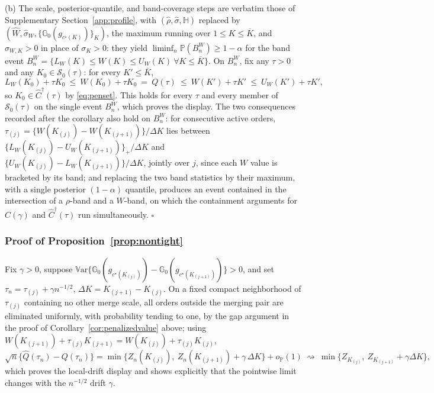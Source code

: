 \documentclass[11pt]{article}
\newcommand{\Pp}{\mathbb P}
\newcommand{\G}{\mathbb G}
\newcommand{\Var}{\mathbb V\mathrm{ar}}
\newcommand{\opro}{o_{\Pp}}
\newcommand{\dto}{\rightsquigarrow}
\newcommand{\calS}{\mathcal S}
\begin{document}
(b) The scale, posterior-quantile, and band-coverage steps are verbatim those of Supplementary Section~\ref{app:profile}, with $(\hat\rho,\hat\sigma,\mathbb H)$ replaced by $(\widehat W,\hat\sigma_W,\{\G_0(g_{c^\star(K)})\}_K)$, the maximum running over $1\le K\le\overline K$, and $\sigma_{W,K}>0$ in place of $\sigma_K>0$: they yield $\liminf_n\Pp(B^W_n)\ge1-\alpha$ for the band event $B^W_n=\{L_W(K)\le W(K)\le U_W(K)\ \forall K\le\overline K\}$. On $B^W_n$, fix any $\tau>0$ and any $K_0\in\calS_0(\tau)$: for every $K'\le\overline K$,
\begin{equation*}
L_W(K_0)+\tau K_0\ \le\ W(K_0)+\tau K_0\ =\ Q(\tau)\ \le\ W(K')+\tau K'\ \le\ U_W(K')+\tau K' ,
\end{equation*}
so $K_0\in\widehat C^\dagger(\tau)$ by \eqref{eq:penset}. This holds for every $\tau$ and every member of $\calS_0(\tau)$ on the single event $B^W_n$, which proves the display. The two consequences recorded after the corollary also hold on $B^W_n$: for consecutive active orders, $\tau_{(j)}=\{W(K_{(j)})-W(K_{(j+1)})\}/\Delta K$ lies between $\{L_W(K_{(j)})-U_W(K_{(j+1)})\}_+/\Delta K$ and $\{U_W(K_{(j)})-L_W(K_{(j+1)})\}/\Delta K$, jointly over $j$, since each $W$ value is bracketed by its band; and replacing the two band statistics by their maximum, with a single posterior $(1-\alpha)$ quantile, produces an event contained in the intersection of a $\rho$-band and a $W$-band, on which the containment arguments for $\widehat C(\gamma)$ and $\widehat C^\dagger(\tau)$ run simultaneously. \hfill$\square$



\subsubsection{Proof of Proposition~\ref{prop:nontight}}
Fix $\gamma>0$, suppose $\Var\{\G_0(g_{c^\star(K_{(j)})})-\G_0(g_{c^\star(K_{(j+1)})})\}>0$, and set $\tau_n=\tau_{(j)}+\gamma n^{-1/2}$, $\Delta K=K_{(j+1)}-K_{(j)}$. On a fixed compact neighborhood of $\tau_{(j)}$ containing no other merge scale, all orders outside the merging pair are eliminated uniformly, with probability tending to one, by the gap argument in the proof of Corollary~\ref{cor:penalizedvalue} above; using $W(K_{(j+1)})+\tau_{(j)}K_{(j+1)}=W(K_{(j)})+\tau_{(j)}K_{(j)}$,
\begin{equation*}
\sqrt n\bigl\{\widehat Q(\tau_n)-Q(\tau_n)\bigr\}
=\min\bigl\{Z_n(K_{(j)}),\ Z_n(K_{(j+1)})+\gamma\,\Delta K\bigr\}+\opro(1)
\ \dto\ \min\bigl\{Z_{K_{(j)}},\ Z_{K_{(j+1)}}+\gamma\Delta K\bigr\},
\end{equation*}
which proves the local-drift display and shows explicitly that the pointwise limit changes with the $n^{-1/2}$ drift $\gamma$.
\end{document}
